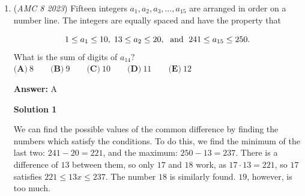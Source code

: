 \begin{enumerate}
 Solution by CHECKMATE2021 (edits by someone that is unknown)

 



\textbf{Solution 3 (Faster)}

Since the length of AC does not matter, we can assume the height of triangle ABC is $h$. We assume that the bases of the first triangle are $11$ and $h$ and the bases of the second triangle are $h-5$ and $h$. Therefore, the area of the trapezoid in the first diagram is $\frac{h^2}{2} - \frac{11^2}{2} = \frac{h^2-11^2}{2}$. (Here we mean that the bases of the triangles are equivalent to its’ height.)

 The area of the triangle in the second diagram is now $\frac{(h-5)^2}{2}$. 

 Therefore, $\frac{h^2 - 11^2}{2} = \frac{(h-5)^2}{2}$. Multiplying both sides by $2$, we get $h^2 - 121 = h^2 - 10h + 25$. Subtracting $h^2 + 25$ from both sides, we get $-146 = -10h$ and $h$ is $\boxed{\textbf{(A)}14.6}$.

 Solution by \href{https://artofproblemsolving.com/wiki/index.php?title=User:ILoveMath31415926535}{ILoveMath31415926535}, and \href{https://artofproblemsolving.com/wiki/index.php?title=User:CHECKMATE2021}{CHECKMATE2021} and \href{https://artofproblemsolving.com/wiki/index.php?title=User:London\_System&action=edit&redlink=1}{London\_System}

 Very minor edit by \href{https://artofproblemsolving.com/wiki/index.php?title=User:Quetzalcoatlus&action=edit&redlink=1}{Quetzalcoatlus}

 


	\item (\textit{AMC 8 2023}) Fifteen integers $a_1, a_2, a_3, \dots, a_{15}$ are arranged in order on a number line. The integers are equally spaced and have the property that

 \[1 \le a_1 \le 10, \thickspace 13 \le a_2 \le 20, \thickspace \text{ and } \thickspace 241 \le a_{15}\le 250.\]
What is the sum of digits of $a_{14}?$
$\textbf{(A)}\ 8 \qquad \textbf{(B)}\ 9 \qquad \textbf{(C)}\ 10 \qquad \textbf{(D)}\ 11 \qquad \textbf{(E)}\ 12$

 \textbf{Answer: }A



\textbf{Solution 1}

We can find the possible values of the common difference by finding the numbers which satisfy the conditions. To do this, we find the minimum of the last two: $241-20=221$, and the maximum: $250-13=237$. There is a difference of $13$ between them, so only $17$ and $18$ work, as $17\cdot13=221$, so $17$ satisfies $221\leq 13x\leq237$. The number $18$ is similarly found. $19$, however, is too much.


\end{enumerate}
